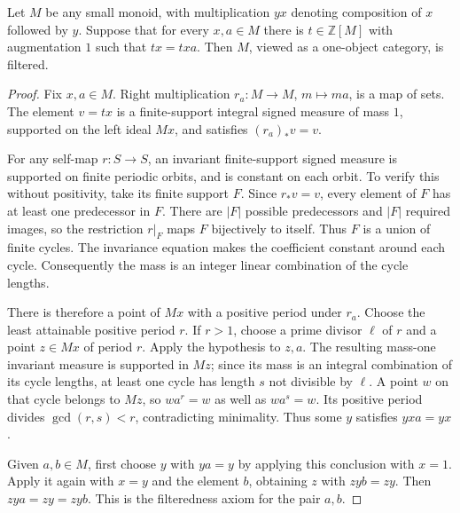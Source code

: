 \begin{lemma}\label{C:monoid-lemma}
Let $M$ be any small monoid, with multiplication $yx$ denoting composition of $x$ followed by $y$. Suppose that for every $x,a\in M$ there is $t\in\mathbb Z[M]$ with augmentation $1$ such that $tx=txa$. Then $M$, viewed as a one-object category, is filtered.
\end{lemma}
\begin{proof}
Fix $x,a\in M$. Right multiplication $r_a:M\to M$, $m\mapsto ma$, is a map of sets. The element $v=tx$ is a finite-support integral signed measure of mass $1$, supported on the left ideal $Mx$, and satisfies $(r_a)_*v=v$.

For any self-map $r:S\to S$, an invariant finite-support signed measure is supported on finite periodic orbits, and is constant on each orbit. To verify this without positivity, take its finite support $F$. Since $r_*v=v$, every element of $F$ has at least one predecessor in $F$. There are $|F|$ possible predecessors and $|F|$ required images, so the restriction $r|_F$ maps $F$ bijectively to itself. Thus $F$ is a union of finite cycles. The invariance equation makes the coefficient constant around each cycle. Consequently the mass is an integer linear combination of the cycle lengths.

There is therefore a point of $Mx$ with a positive period under $r_a$. Choose the least attainable positive period $r$. If $r>1$, choose a prime divisor $\ell$ of $r$ and a point $z\in Mx$ of period $r$. Apply the hypothesis to $z,a$. The resulting mass-one invariant measure is supported in $Mz$; since its mass is an integral combination of its cycle lengths, at least one cycle has length $s$ not divisible by $\ell$. A point $w$ on that cycle belongs to $Mz$, so $wa^r=w$ as well as $wa^s=w$. Its positive period divides $\gcd(r,s)<r$, contradicting minimality. Thus some $y$ satisfies $yxa=yx$.

Given $a,b\in M$, first choose $y$ with $ya=y$ by applying this conclusion with $x=1$. Apply it again with $x=y$ and the element $b$, obtaining $z$ with $zyb=zy$. Then $zya=zy=zyb$. This is the filteredness axiom for the pair $a,b$.
\end{proof}

